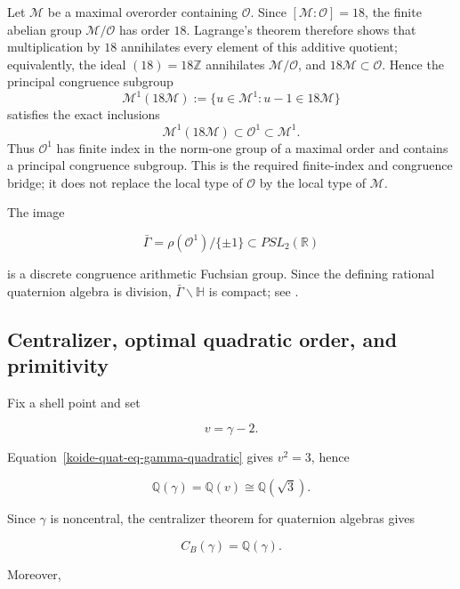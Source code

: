 Let \(\mathcal M\) be a maximal overorder containing \(\mathcal O\).
Since \([\mathcal M:\mathcal O]=18\), the finite abelian group
\(\mathcal M/\mathcal O\) has order \(18\).  Lagrange's theorem therefore
shows that multiplication by \(18\) annihilates every element of this
additive quotient; equivalently, the ideal \((18)=18\mathbb Z\) annihilates
\(\mathcal M/\mathcal O\), and \(18\mathcal M\subset\mathcal O\).  Hence the
principal congruence subgroup
\[
 \mathcal M^1(18\mathcal M)
 :=\{u\in\mathcal M^1:u-1\in18\mathcal M\}
\]
satisfies the exact inclusions
\[
 \mathcal M^1(18\mathcal M)\subset\mathcal O^1\subset\mathcal M^1.
\]
Thus \(\mathcal O^1\) has finite index in the norm-one group of a maximal
order and contains a principal congruence subgroup.  This is the required
finite-index and congruence bridge; it does not replace the local type of
\(\mathcal O\) by the local type of \(\mathcal M\).

The image

\[
 \bar\Gamma=\rho(\mathcal O^1)/\{\pm1\}
 \subset PSL_2(\mathbb R)
\]

is a discrete congruence arithmetic Fuchsian group. Since the defining
rational quaternion algebra is division,
\(\bar\Gamma\backslash\mathbb H\) is compact; see
\cite[Lemma~38.1.2, Proposition~38.1.3, and Definition~38.7.2]{Voight_2021}.

\subsection{Centralizer, optimal quadratic order, and primitivity}\label{koide-quat-centralizer-optimal-quadratic-order-and-primitivity}

Fix a shell point and set

\[
 v=\gamma-2.
\]

Equation~\eqref{koide-quat-eq-gamma-quadratic} gives \(v^2=3\), hence

\begin{equation}\label{koide-quat-eq-quadratic-field}
 \mathbb Q(\gamma)=\mathbb Q(v)\cong\mathbb Q(\sqrt3).
\end{equation}

Since \(\gamma\) is noncentral, the centralizer theorem for quaternion algebras gives

\begin{equation}\label{koide-quat-eq-algebra-centralizer}
 C_B(\gamma)=\mathbb Q(\gamma).
\end{equation}

Moreover,

